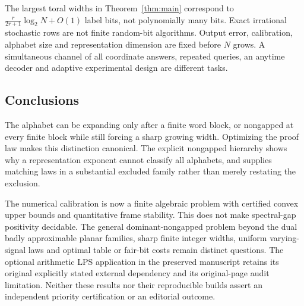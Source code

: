 The largest toral widths in Theorem~\ref{thm:main} correspond to
$\frac{r}{2r+1}\log_2N+O(1)$ label bits, not polynomially many bits. Exact irrational stochastic rows are not finite random-bit algorithms. Output error, calibration, alphabet size and representation dimension are fixed before $N$ grows. A simultaneous channel of all coordinate answers, repeated queries, an anytime decoder and adaptive experimental design are different tasks.

\subsection{Conclusions}
The alphabet can be expanding only after a finite word block, or nongapped at every finite block while still forcing a sharp growing width. Optimizing the proof law makes this distinction canonical. The explicit nongapped hierarchy shows why a representation exponent cannot classify all alphabets, and supplies matching laws in a substantial excluded family rather than merely restating the exclusion.

The numerical calibration is now a finite algebraic problem with certified convex upper bounds and quantitative frame stability. This does not make spectral-gap positivity decidable. The general dominant-nongapped problem beyond the dual badly approximable planar families, sharp finite integer widths, uniform varying-signal laws and optimal table or fair-bit costs remain distinct questions. The optional arithmetic LPS application in the preserved manuscript retains its original explicitly stated external dependency and its original-page audit limitation. Neither these results nor their reproducible builds assert an independent priority certification or an editorial outcome.
